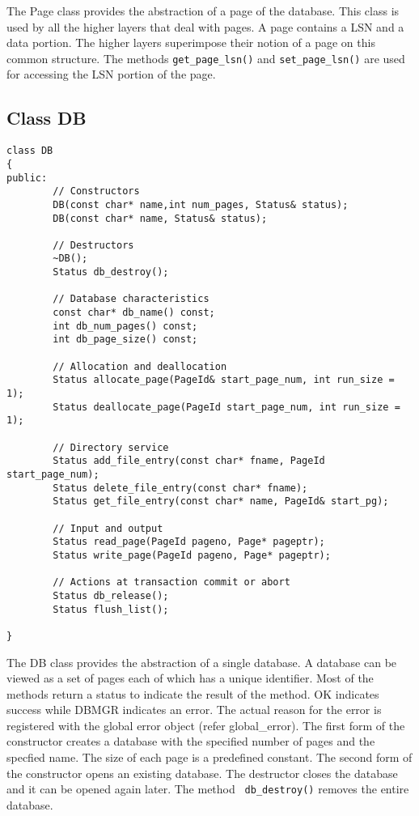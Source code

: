 The  Page  class provides   the    abstraction  of  a  page  of    the
database. This class is  used by all the higher  layers that deal with
pages. A  page contains  a LSN and  a data  portion. The higher layers
superimpose their  notion of  a page  on   this common structure.  The
methods  {\tt  get\_page\_lsn()} and {\tt   set\_page\_lsn()} are used for
accessing the LSN portion of the page.


\subsection{Class DB}
\begin{verbatim}
class DB
{
public:
        // Constructors
        DB(const char* name,int num_pages, Status& status);
        DB(const char* name, Status& status);

        // Destructors
        ~DB();
        Status db_destroy();

        // Database characteristics
        const char* db_name() const;
        int db_num_pages() const;
        int db_page_size() const;

        // Allocation and deallocation
        Status allocate_page(PageId& start_page_num, int run_size = 1);
        Status deallocate_page(PageId start_page_num, int run_size = 1);

        // Directory service
        Status add_file_entry(const char* fname, PageId start_page_num);
        Status delete_file_entry(const char* fname);
        Status get_file_entry(const char* name, PageId& start_pg);

        // Input and output
        Status read_page(PageId pageno, Page* pageptr);
        Status write_page(PageId pageno, Page* pageptr);

        // Actions at transaction commit or abort 
        Status db_release();
        Status flush_list();

}
\end{verbatim}

The  DB   class provides  the abstraction of   a   single database.  A
database can be  viewed as a set  of pages each of  which has a unique
identifier. Most of the methods return a status to indicate the result
of   the  method.  OK indicates  success    while  DBMGR indicates  an
error. The actual  reason for the error is  registered with the global
error object (refer global\_error).  The  first form of the constructor
creates a database with the specified number of pages and the specfied
name. The size of each page is a  predefined constant. The second form
of the constructor opens  an existing database. The destructor  closes
the database  and  it can   be  opened again  later. The  method  {\tt
db\_destroy()} removes the entire database.

